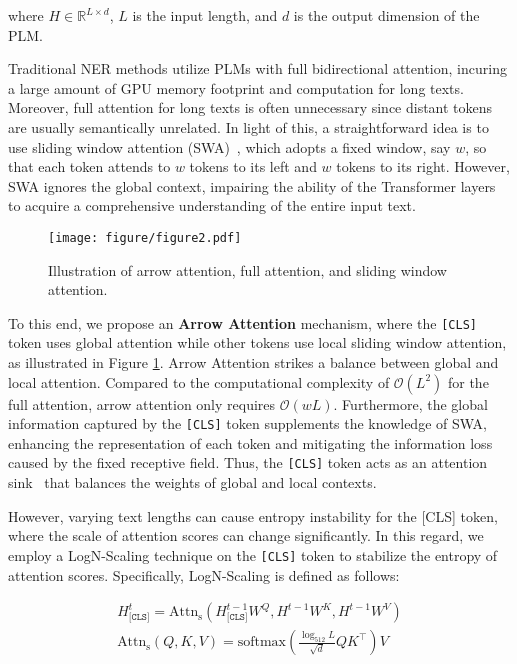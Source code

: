 \noindent where $H\in \mathbb{R}^{L\times d}$, $L$ is the input length, and $d$ is the output dimension of the PLM. 

Traditional NER methods utilize PLMs with full bidirectional attention, incuring a large amount of GPU memory footprint and computation for long texts.
Moreover, full attention for long texts is often unnecessary since distant tokens are usually semantically unrelated.
In light of this, a straightforward idea is to use sliding window attention (SWA)~\cite{beltagy2020longformer, zaheer2020big},
which adopts a fixed window, say $w$, so that 
each token attends to $w$ tokens to its left and $w$ tokens to its right.
However, SWA ignores the global context, impairing the ability of the Transformer layers to acquire a comprehensive understanding of the entire input text.

\begin{figure}[t]
\centering
\texttt{[image: figure/figure2.pdf]} %
\caption{Illustration of arrow attention, full attention, and sliding window attention.}
\label{fig:arrow-attention}
\end{figure}

To this end, we propose an \textbf{Arrow Attention} mechanism,
where the \texttt{[CLS]} token uses global attention while other tokens use local sliding window attention, as illustrated in Figure \ref{fig:arrow-attention}.
Arrow Attention strikes a balance between global and local attention.
Compared to the computational complexity of $\mathcal{O} (L^2)$ for the full attention, 
arrow attention only requires $\mathcal{O} (wL)$.
Furthermore, the global information captured by the \texttt{[CLS]} token supplements the knowledge of SWA, 
enhancing the representation of each token and mitigating the information loss caused by the fixed receptive field.
Thus, the \texttt{[CLS]} token acts as an attention sink~\cite{xiao2023efficient} 
that balances the weights of global and local contexts.

However, varying text lengths can cause entropy instability for the {[CLS]} token, where the scale of attention scores can change significantly.
In this regard, we employ a LogN-Scaling technique on the \texttt{[CLS]} token to stabilize the entropy of attention scores.
Specifically, LogN-Scaling is defined as follows:

\begin{align}
{H}^{t}_{\texttt{[CLS]}}=\text{Attn}_{\text{s}}\left ( H^{t-1}_{\texttt{[CLS]}}W^{Q}, H^{t-1}W^{K}, H^{t-1}W^{V} \right )\\
\text{Attn}_{\text{s}}\left ( Q, K, V \right )=\text{softmax}\left ( \frac{{\log_{512}}{L}}{\sqrt{d}}QK^{\top} \right )V\label{eq3}
\end{align}

